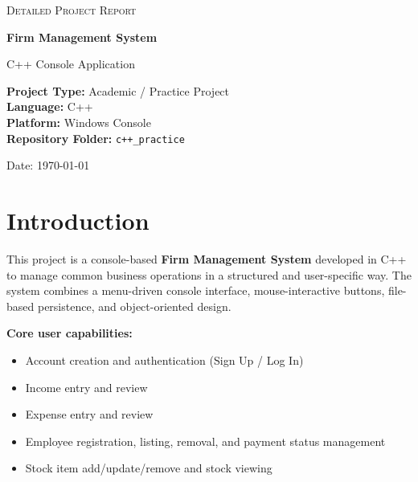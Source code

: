 \documentclass[12pt,a4paper]{article}
\begin{document}
\begin{titlepage}
    \centering
    {\scshape\LARGE Detailed Project Report \par}
    \vspace{1cm}
    {\huge\bfseries\color{primary}Firm Management System\par}
    \vspace{0.8cm}
    {\Large\color{secondary}C++ Console Application\par}
    \vspace{1.2cm}

    \begin{tcolorbox}[colback=lightbg,colframe=primary,width=0.9\textwidth,arc=2mm]
        \centering
        \textbf{Project Type:} Academic / Practice Project\\
        \textbf{Language:} C++\\
        \textbf{Platform:} Windows Console\\
        \textbf{Repository Folder:} \texttt{c++\_practice}
    \end{tcolorbox}

    \vfill
    {\large Date: \today\par}
\end{titlepage}

\tableofcontents
\newpage

\section{Introduction}
This project is a console-based \textbf{Firm Management System} developed in C++ to manage common business operations in a structured and user-specific way. The system combines a menu-driven console interface, mouse-interactive buttons, file-based persistence, and object-oriented design.

\textbf{Core user capabilities:}
\begin{itemize}[leftmargin=1.4em]
    \item Account creation and authentication (Sign Up / Log In)
    \item Income entry and review
    \item Expense entry and review
    \item Employee registration, listing, removal, and payment status management
    \item Stock item add/update/remove and stock viewing
\end{itemize}
\end{document}
